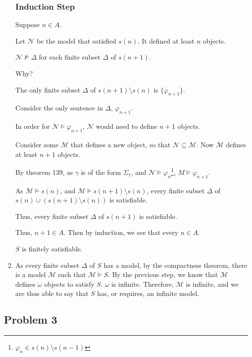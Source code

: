 \documentclass[a4paper]{article}
\newcommand{\SET}[1]{\{ {#1} \}}
\begin{document}
\begin{enumerate}
    \subsubsection*{Induction Step} 

    Suppose $n \in A$. 
    
    Let $\mathcal{N}$ be the model that satisfied $s(n)$. It defined at least $n$ objects. 

    $\mathcal{N} \not\models \Delta$ for each finite subset $\Delta$ of $s(n + 1)$.

    Why?

    The only finite subset $\Delta$ of $s(n + 1) \setminus s(n)$ is $\SET{\varphi_{n + 1}}$.

    Consider the only sentence in $\Delta$, $\varphi_{n + 1}$. 

    In order for $\mathcal{N} \models \varphi_{n + 1}$, $\mathcal{N}$ would need to define $n + 1$ objects.

    Consider some $\mathcal{M}$ that defines a new object, so that $\mathcal{N} \subseteq \mathcal{M}$. Now $\mathcal{M}$ defines at least $n + 1$ objects. 

    By theorem 139, as $\gamma$ is of the form $\Sigma_1$, and $\mathcal{N} \models \varphi_n$\footnote{$\varphi_n \in s(n) \setminus s(n -1)$}, $M \models \varphi_{n + 1}$.
    
    As $\mathcal{M} \models s(n)$, and $\mathcal{M} \models s(n + 1) \setminus s(n)$, every finite subset $\Delta$ of $s(n) \cup (s(n + 1) \setminus s(n))$ is satisfiable.

    Thus, every finite subset $\Delta$ of $s(n + 1)$ is satisfiable. 

    Thus, $n + 1 \in A$. Then by induction, we see that every $n \in A$.

    $S$ is finitely satisfiable.

    \item As every finite subset $\Delta$ of $S$ has a model, by the compactness theorem, there is a model $\mathcal{M}$ such that $\mathcal{M} \models S$. By the previous step, we know that $\mathcal{M}$ defines $\omega$ objects to satisfy $S$. $\omega$ is infinite. Therefore, $\mathcal{M}$ is infinite, and we are thus able to say that $S$ has, or requires, an infinite model.

\end{enumerate}

\newpage
\subsection*{Problem 3}
\end{document}
